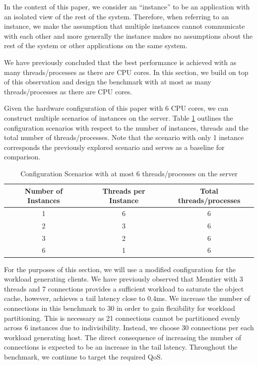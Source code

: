 In the context of this paper, we consider an ``instance'' to be an application with an isolated view of the rest of the system. Therefore, when referring to an instance, we make the assumption that multiple instances cannot communicate with each other and more generally the instance makes no assumptions about the rest of the system or other applications on the same system.

We have previously concluded that the best performance is achieved with as many threads/processes as there are CPU cores. In this section, we build on top of this observation and design the benchmark with at most as many threads/processes as there are CPU cores.

Given the hardware configuration of this paper with 6 CPU cores, we can construct multiple scenarios of instances on the server. Table \ref{tab:m_instances_config} outlines the configuration scenarios with respect to the number of instances, threads and the total number of threads/processes. Note that the scenario with only 1 instance corresponds the previously explored scenario and serves as a baseline for comparison.

\begin{table}[h!]
\centering
\begin{tabular}{| c c c |}
 \hline
 Number of Instances & Threads per Instance & Total threads/processes \\ [0.5ex]
 \hline\hline

 1 & 6 & 6 \\
 2 & 3 & 6 \\
 3 & 2 & 6 \\
 6 & 1 & 6 \\

 \hline

\end{tabular}
\caption{Configuration Scenarios with at most 6 threads/processes on the server}
\label{tab:m_instances_config}
\end{table}

For the purposes of this section, we will use a modified configuration for the workload generating clients. We have previously observed that Memtier with 3 threads and 7 connections provides a sufficient workload to saturate the object cache, however, achieves a tail latency close to 0.4ms. We increase the number of connections in this benchmark to 30 in order to gain flexibility for workload partitioning. This is necessary as 21 connections cannot be partitioned evenly across 6 instances due to indivisibility. Instead, we choose 30 connections per each workload generating host. The direct consequence of increasing the number of connections is expected to be an increase in the tail latency. Throughout the benchmark, we continue to target the required QoS.

